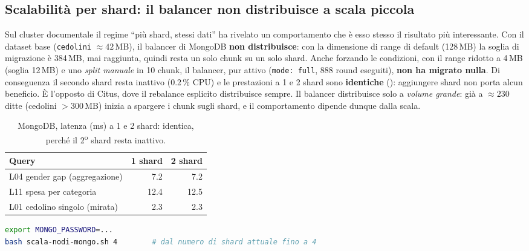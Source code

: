 \subsection{Scalabilità per shard: il balancer non distribuisce a scala piccola}
Sul cluster documentale il regime ``più shard, stessi dati'' ha rivelato un comportamento che è esso stesso il
risultato più interessante. Con il dataset base (\texttt{cedolini} ${\approx}42$\,MB), il balancer di MongoDB
\textbf{non distribuisce}: con la dimensione di range di default (128\,MB) la soglia di migrazione è 384\,MB,
mai raggiunta, quindi resta un solo chunk su un solo shard. Anche forzando le condizioni, con il range
ridotto a 4\,MB (soglia 12\,MB) e uno \emph{split manuale} in 10 chunk, il balancer, pur attivo (\texttt{mode: full},
888 round eseguiti), \textbf{non ha migrato nulla}. Di conseguenza il secondo shard resta inattivo (0.2\,\%
CPU) e le prestazioni a 1 e 2 shard sono \textbf{identiche} (): aggiungere shard non
porta alcun beneficio. È l'opposto di Citus, dove il rebalance esplicito distribuisce sempre. Il balancer
distribuisce solo a \emph{volume grande}: già a ${\approx}230$ ditte (cedolini ${>}300$\,MB) inizia a spargere
i chunk sugli shard, e il comportamento dipende dunque dalla scala.

\begin{table}[htbp]
  \centering
  \caption{MongoDB, latenza (ms) a 1 e 2 shard: identica, perché il 2\textsuperscript{o} shard resta inattivo.}
  \label{tab:mongo-shard}
  \begin{tabular}{lrr}
    \toprule
    \textbf{Query} & \textbf{1 shard} & \textbf{2 shard} \\
    \midrule
    L04 gender gap (aggregazione) & 7.2  & 7.2  \\
    L11 spesa per categoria        & 12.4 & 12.5 \\
    L01 cedolino singolo (mirata)  & 2.3  & 2.3  \\
    \bottomrule
  \end{tabular}
\end{table}

\begin{lstlisting}[style=sobrio, language=bash, caption={Esecuzione dello scaling per shard (MongoDB): aggiunta automatica degli shard e 3 run a freddo delle letture per passo.}]
export MONGO_PASSWORD=...
bash scala-nodi-mongo.sh 4        # dal numero di shard attuale fino a 4
\end{lstlisting}

